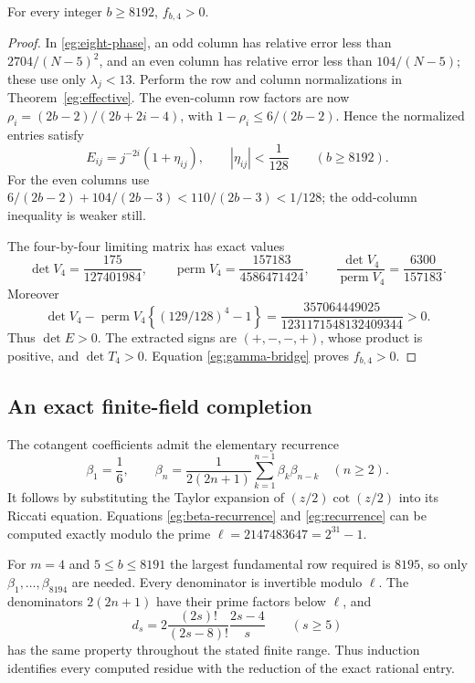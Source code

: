 \begin{proposition}
\label{eg:eight-positive}
For every integer $b\ge8192$, $f_{b,4}>0$.
\end{proposition}

\begin{proof}
In \eqref{eg:eight-phase}, an odd column has relative error less
than $2704/(N-5)^2$, and an even column has relative error less
than $104/(N-5)$; these use only $\lambda_j<13$.
Perform the row and column normalizations in Theorem~\ref{eg:effective}.
The even-column row factors are now
$\rho_i=(2b-2)/(2b+2i-4)$, with
$1-\rho_i\le6/(2b-2)$.
Hence the normalized entries satisfy
\[
 E_{ij}=j^{-2i}(1+\eta_{ij}),\qquad
 |\eta_{ij}|<\frac1{128}\qquad(b\ge8192).
\]
For the even columns use
$6/(2b-2)+104/(2b-3)<110/(2b-3)<1/128$;
the odd-column inequality is weaker still.

The four-by-four limiting matrix has exact values
\[
 \det V_4=\frac{175}{127401984},\qquad
 \operatorname{perm}V_4=\frac{157183}{4586471424},\qquad
 \frac{\det V_4}{\operatorname{perm}V_4}=\frac{6300}{157183}.
\]
Moreover
\[
 \det V_4-\operatorname{perm}V_4
        \left\{(129/128)^4-1\right\}
       =\frac{357064449025}{1231171548132409344}>0.
\]
Thus $\det E>0$.  The extracted signs are $(+,-,-,+)$, whose
product is positive, and $\det T_4>0$.  Equation
\eqref{eg:gamma-bridge} proves $f_{b,4}>0$.
\end{proof}

\subsection{An exact finite-field completion}

The cotangent coefficients admit the elementary recurrence
\begin{equation}\label{eg:beta-recurrence}
 \beta_1=\frac16,\qquad
 \beta_n=\frac1{2(2n+1)}\sum_{k=1}^{n-1}\beta_k\beta_{n-k}
                  \quad(n\ge2).
\end{equation}
It follows by substituting the Taylor expansion of
$(z/2)\cot(z/2)$ into its Riccati equation.
Equations \eqref{eg:beta-recurrence} and \eqref{eg:recurrence}
can be computed exactly modulo the prime
$\ell=2147483647=2^{31}-1$.

For $m=4$ and $5\le b\le8191$ the largest fundamental row
required is $8195$, so only $\beta_1,\ldots,\beta_{8194}$ are needed.
Every denominator is invertible modulo $\ell$.  The denominators
$2(2n+1)$ have their prime factors below $\ell$, and
\begin{equation}\label{eg:diagonal-factorization}
 d_s=2\frac{(2s)!}{(2s-8)!}\frac{2s-4}{s}\qquad(s\ge5)
\end{equation}
has the same property throughout the stated finite range.  Thus
induction identifies every computed residue with the reduction of
the exact rational entry.

